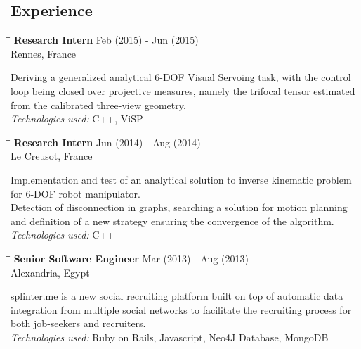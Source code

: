\documentclass{res}
\begin{document}
\begin{resume}
\section{Experience}
   \vspace{-0.1in}
   \begin{tabbing}
   \hspace{2.7in}\= \hspace{1.8in}\= \kill %
   {\bf Research Intern}\> \hfill Feb (2015) - Jun (2015)\\
                                    \>Rennes, France
   \end{tabbing}\vspace{-20pt}      %
    Deriving a generalized analytical 6-DOF Visual Servoing task, with the control loop being closed over projective measures, namely the trifocal tensor estimated from the calibrated three-view geometry. \\
    {\sl Technologies used:}  C++, ViSP

   \begin{tabbing}
   \hspace{2.7in}\= \hspace{1.8in}\= \kill %
   {\bf Research Intern}\> \hfill Jun (2014) - Aug (2014)\\
                                    \>Le Creusot, France
   \end{tabbing}\vspace{-20pt}      %
    Implementation and test of an analytical solution to inverse kinematic problem for 6-DOF robot manipulator.\\
    Detection of disconnection in graphs, searching a solution for motion planning and definition of a new strategy ensuring the convergence of the algorithm.\\
    {\sl Technologies used:}  C++

   \begin{tabbing}
   \hspace{2.7in}\= \hspace{1.8in}\= \kill %
    {\bf Senior Software Engineer}\> \hfill Mar (2013) - Aug (2013)\\
                                    \>Alexandria, Egypt
   \end{tabbing}\vspace{-20pt}      %
    splinter.me is a new social recruiting platform built on top of automatic data integration from multiple social networks to facilitate the recruiting process for both job-seekers and recruiters.\\
    {\sl Technologies used:} Ruby on Rails, Javascript, Neo4J Database, MongoDB


\end{resume}
\end{document}
